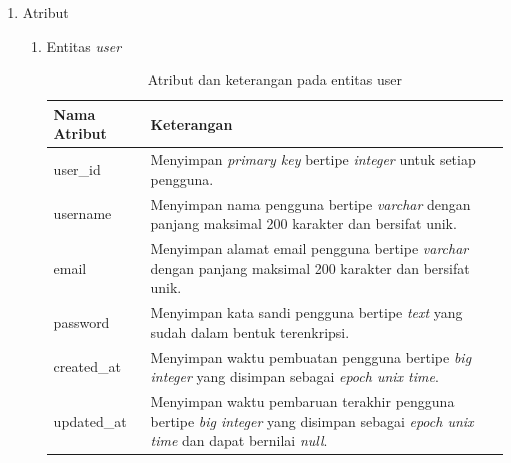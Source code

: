 \begin{enumerate}[label*=\arabic*.,ref=\arabic*]
    \item Atribut
    \begin{enumerate}[label=\arabic*.]
        \item Entitas \textit{user}
        \vspace{-0.5em}
        \begin{table}[H]
            \centering
            \begin{tabular}{|p{3.25cm}|p{8cm}|}
                \hline
                \rowcolor[HTML]{DAE8FC} 
                {\color[HTML]{000000} Nama Atribut} & {\color[HTML]{000000} Keterangan}           \\ \hline
                user\_id                           & Menyimpan \textit{primary key} bertipe \textit{integer} untuk setiap pengguna. \\ \hline
                username                           & Menyimpan nama pengguna bertipe \textit{varchar} dengan panjang maksimal 200 karakter dan bersifat unik. \\ \hline
                email                              & Menyimpan alamat email pengguna bertipe \textit{varchar} dengan panjang maksimal 200 karakter dan bersifat unik. \\ \hline
                password                           & Menyimpan kata sandi pengguna bertipe \textit{text} yang sudah dalam bentuk terenkripsi. \\ \hline
                created\_at                        & Menyimpan waktu pembuatan pengguna bertipe \textit{big integer} yang disimpan sebagai \textit{epoch unix time}. \\ \hline
                updated\_at                        & Menyimpan waktu pembaruan terakhir pengguna bertipe \textit{big integer} yang disimpan sebagai \textit{epoch unix time} dan dapat bernilai \textit{null}. \\ \hline
            \end{tabular}
            \caption{Atribut dan keterangan pada entitas user}
            \label{tab:user_entity}
        \end{table}


\end{enumerate}
\end{enumerate}
